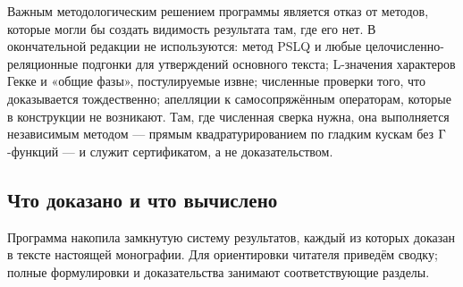 Важным методологическим решением программы является отказ от методов,
которые могли бы создать видимость результата там, где его нет. В
окончательной редакции не используются: метод PSLQ и любые
целочисленно-реляционные подгонки для утверждений основного текста;
L-значения характеров Гекке и «общие фазы», постулируемые извне;
численные проверки того, что доказывается тождественно; апелляции к
самосопряжённым операторам, которые в конструкции не возникают. Там,
где численная сверка нужна, она выполняется независимым методом —
прямым квадратурированием по гладким кускам без $\Gamma$-функций — и
служит сертификатом, а не доказательством.

\subsection{Что доказано и что вычислено}

Программа накопила замкнутую систему результатов, каждый из которых
доказан в тексте настоящей монографии. Для ориентировки читателя
приведём сводку; полные формулировки и доказательства занимают
соответствующие разделы.

